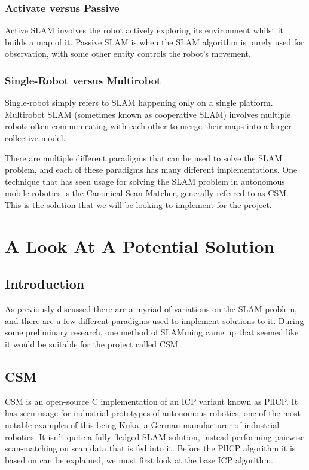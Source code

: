 					
					\subsubsection{Activate versus Passive}
					Active SLAM involves the robot actively exploring its environment whilst it builds a map of it. Passive SLAM is when the SLAM algorithm is purely used for observation, with some other entity controls the robot's movement. 
					
					\subsubsection{Single-Robot versus Multirobot}
					Single-robot simply refers to SLAM happening only on a single platform. Multirobot SLAM (sometimes known as cooperative SLAM) involves multiple robots often communicating with each other to merge their maps into a larger collective model. 
				
					\medskip
					There are multiple different paradigms that can be used to solve the SLAM problem, and each of these paradigms has many different implementations. One technique that has seen usage for solving the SLAM problem in autonomous mobile robotics is the Canonical Scan Matcher, generally referred to as CSM. This is the solution that we will be looking to implement for the project.

			\section{A Look At A Potential Solution}
				\subsection{Introduction}
				As previously discussed there are a myriad of variations on the SLAM problem, and there are a few different paradigms used to implement solutions to it. During some preliminary research, one method of SLAMming came up that seemed like it would be suitable for the project called CSM.
				
				\subsection{CSM}
				CSM is an open-source C implementation of an ICP variant known as PlICP. It has seen usage for industrial prototypes of autonomous robotics, one of the most notable examples of this being Kuka, a German manufacturer of industrial robotics. It isn't quite a fully fledged SLAM solution, instead performing pairwise scan-matching on scan data that is fed into it. Before the PlICP algorithm it is based on can be explained, we must first look at the base ICP algorithm.
			
